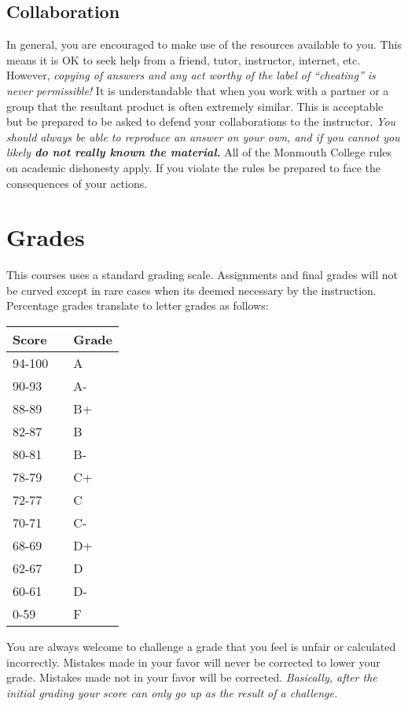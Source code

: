 \documentclass[10pt]{article}
\begin{document}
\subsection{Collaboration}

In general, you are encouraged to make use of the resources available to you.  This means it is OK to seek help from a friend, tutor, instructor, internet, etc.  However, \textit{copying of answers and any act worthy of the label of ``cheating'' is never permissible!}  It is understandable that when you work with a partner or a group that the resultant product is often extremely similar.  This is acceptable but be prepared to be asked to defend your collaborations to the instructor.  \textit{You should always be able to reproduce an answer on your own, and if you cannot you likely \textbf{do not really known the material.}} All of the Monmouth College rules on academic dishonesty apply.  If you violate the rules be prepared to face the consequences of your actions.  

\section{Grades}

This courses uses a standard grading scale.  Assignments and final grades will not be curved except in rare cases when its deemed necessary by the instruction.  Percentage grades translate to letter grades as follows:

\begin{center}
\begin{small}
\begin{tabular}{lcl}
Score & & Grade \\ \hline
94-100 & & A \\
90-93 & & A- \\
88-89 & & B+ \\
82-87 & & B \\
80-81 & & B- \\
78-79 & & C+ \\
72-77 & & C \\
70-71 & & C- \\
68-69 & & D+ \\
62-67 & & D \\
60-61 & & D- \\
0-59 & & F 
\end{tabular}
\end{small}
\end{center}

You are always welcome to challenge a grade that you feel is unfair or calculated incorrectly.  Mistakes made in your favor will never be corrected to lower your grade.  Mistakes made not in your favor will be corrected.  \textit{Basically, after the initial grading your score can only go up as the result of a challenge.}
\end{document}
